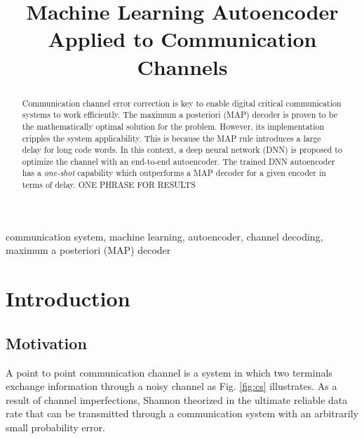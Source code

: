 \documentclass[conference]{IEEEtran}
\begin{document}
\title{Machine Learning Autoencoder Applied to Communication Channels}


\author{

}


\maketitle

\begin{abstract}

Communication channel error correction is key to enable digital critical communication systems to work efficiently. The maximum a posteriori (MAP) decoder is proven to be the mathematically optimal solution for the problem. However, its implementation cripples the system applicability. This is because the MAP rule introduces a large delay for long code words. In this context, a deep neural network (DNN) is proposed to optimize the channel with an end-to-end autoencoder. The trained DNN autoencoder has a \textit{one-shot} capability which outperforms a MAP decoder for a given encoder in terms of delay. ONE PHRASE FOR RESULTS

\end{abstract}

\begin{IEEEkeywords}
communication system, machine learning,  autoencoder, channel decoding, maximum a posteriori (MAP) decoder 
\end{IEEEkeywords}

\section{Introduction}
\subsection{Motivation}
A point to point communication channel is a system in which  two terminals exchange information through a noisy channel as Fig. \ref{fig:cs} illustrates. As a result of channel imperfections, Shannon theorized in \cite{Shannon:2001:MTC:584091.584093} the ultimate reliable data rate that can be transmitted through a communication system with an arbitrarily small probability error. 
\end{document}
